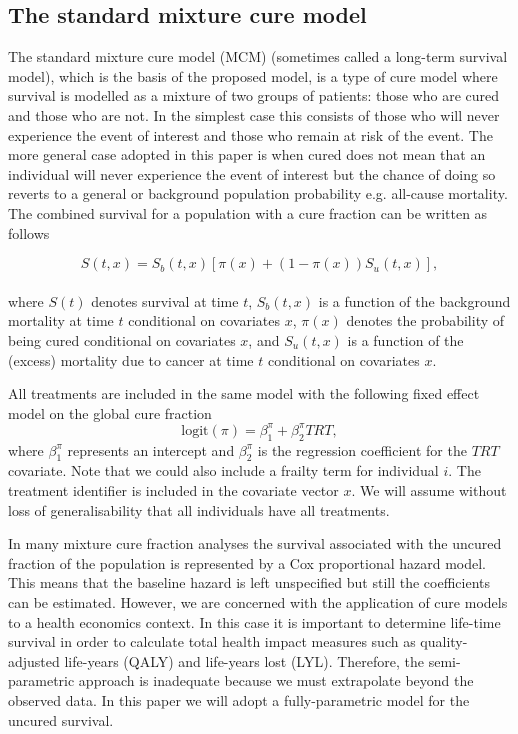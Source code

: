 \documentclass[AMA,STIX1COL]{WileyNJD-v2}
\begin{document}
\subsection{The standard mixture cure model} \label{section:basic_model}
The standard mixture cure model (MCM) (sometimes called a long-term survival model), which is the basis of the proposed model,
is a type of cure model where survival is modelled as a mixture of two groups of patients:
those who are cured and those who are not.
In the simplest case this consists of those who will never experience the event of interest and those who remain at risk of the event.
The more general case adopted in this paper is when cured does not mean that an individual will never experience the event of interest but the chance of doing so reverts to a general or background population probability e.g. all-cause mortality.
The combined survival for a population with a cure fraction can be written as follows

\begin{equation}
\label{eqn:mcm}
S(t, x) = S_b(t, x) [\pi(x) + (1 - \pi(x)) S_u(t, x)],
\end{equation}
\\
\noindent
where $S(t)$ denotes survival at time $t$,
$S_b(t, x)$ is a function of the background mortality at time $t$ conditional on covariates $x$,
$\pi(x)$ denotes the probability of being cured conditional on covariates $x$,
and $S_u(t, x)$ is a function of the (excess) mortality due to cancer at time $t$ conditional on covariates $x$.

All treatments are included in the same model with the following fixed effect model on the global cure fraction
$$
\text{logit}(\pi) = \beta^{\pi}_1 + \beta^{\pi}_2 TRT,
$$
where $\beta^{\pi}_1$ represents an intercept and $\beta^{\pi}_2$ is the regression coefficient for the $TRT$ covariate.
Note that we could also include a frailty term for individual $i$.
The treatment identifier is included in the covariate vector $x$.
We will assume without loss of generalisability that all individuals have all treatments.

In many mixture cure fraction analyses the survival associated with the uncured fraction of the population is represented by a Cox proportional hazard model.
This means that the baseline hazard is left unspecified but still the coefficients can be estimated.
However, we are concerned with the application of cure models to a health economics context.
In this case it is important to determine life-time survival in order to calculate total health impact measures such as quality-adjusted life-years (QALY) and life-years lost (LYL).
Therefore, the semi-parametric approach is inadequate because we must extrapolate beyond the observed data.
In this paper we will adopt a fully-parametric model for the uncured survival.
\end{document}
